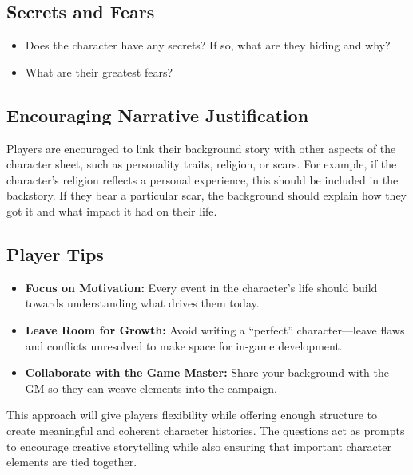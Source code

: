 \subsection*{Secrets and Fears}

\begin{itemize}
    \item Does the character have any secrets? If so, what are they hiding and why?
    \item What are their greatest fears?
\end{itemize}

\subsection*{Encouraging Narrative Justification}

Players are encouraged to link their background story with other aspects of the character sheet, such as personality traits, religion, or scars. For example, if the character's religion reflects a personal experience, this should be included in the backstory. If they bear a particular scar, the background should explain how they got it and what impact it had on their life.

\subsection*{Player Tips}

\begin{itemize}
    \item \textbf{Focus on Motivation:} Every event in the character's life should build towards understanding what drives them today.
    \item \textbf{Leave Room for Growth:} Avoid writing a ``perfect'' character—leave flaws and conflicts unresolved to make space for in-game development.
    \item \textbf{Collaborate with the Game Master:} Share your background with the GM so they can weave elements into the campaign.
\end{itemize}

This approach will give players flexibility while offering enough structure to create meaningful and coherent character histories. The questions act as prompts to encourage creative storytelling while also ensuring that important character elements are tied together.

